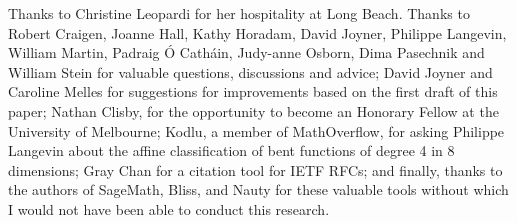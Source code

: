 \documentclass[12pt,a4paper]{article}
\begin{document}
Thanks to Christine Leopardi for her hospitality at Long Beach.
Thanks to
Robert Craigen,
Joanne Hall,
Kathy Horadam,
David Joyner,
Philippe Langevin,
William Martin,
Padraig {\'O} Cath{\'a}in,
Judy-anne Osborn,
Dima Pasechnik and
William Stein
for valuable questions, discussions and advice;
David Joyner and Caroline Melles for suggestions for improvements based on the first draft of this paper;
Nathan Clisby, for the opportunity to become an Honorary Fellow at the University of Melbourne;
Kodlu, a member of MathOverflow, for asking Philippe Langevin about the affine classification
of bent functions of degree 4 in 8 dimensions;
Gray Chan for a citation tool for IETF RFCs;
and finally, thanks to the authors of SageMath, Bliss, and Nauty for these valuable tools
without which I would not have been able to conduct this research.
\normalsize{}








%
\end{document}
